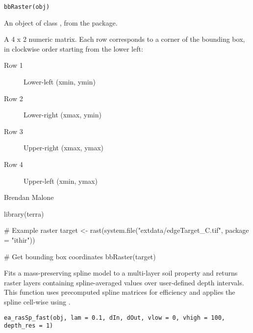 \documentclass[a4paper]{book}
\begin{document}
%
\begin{Usage}
\begin{verbatim}
bbRaster(obj)
\end{verbatim}
\end{Usage}
%
\begin{Arguments}
\begin{ldescription}
\item[\code{obj}] An object of class , from the  package.
\end{ldescription}
\end{Arguments}
%
\begin{Value}
A 4 x 2 numeric matrix. Each row corresponds to a corner of the bounding box, in clockwise order starting from the lower left:
\begin{description}

\item[Row 1] Lower-left (xmin, ymin)
\item[Row 2] Lower-right (xmax, ymin)
\item[Row 3] Upper-right (xmax, ymax)
\item[Row 4] Upper-left (xmin, ymax)

\end{description}

\end{Value}
%
\begin{Author}
Brendan Malone
\end{Author}
%
\begin{Examples}
\begin{ExampleCode}
library(terra)

# Example raster
target <- rast(system.file("extdata/edgeTarget_C.tif", package = "ithir"))

# Get bounding box coordinates
bbRaster(target)
\end{ExampleCode}
\end{Examples}
%
\begin{Description}
Fits a mass-preserving spline model to a multi-layer soil property  and returns raster layers containing spline-averaged values over user-defined depth intervals.
This function uses precomputed spline matrices for efficiency and applies the spline cell-wise using .
\end{Description}
%
\begin{Usage}
\begin{verbatim}
ea_rasSp_fast(obj, lam = 0.1, dIn, dOut, vlow = 0, vhigh = 100, depth_res = 1)
\end{verbatim}
\end{Usage}
\end{document}
